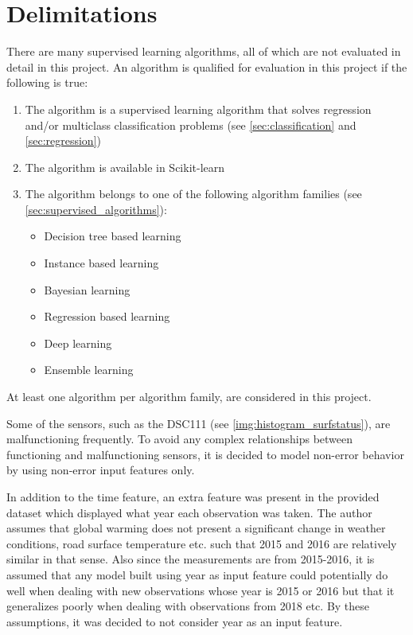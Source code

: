 \section{Delimitations} \label{sec:delimitations}
	There are many supervised learning algorithms, all of which are not evaluated in detail in this project. An algorithm is qualified for evaluation in this project if the following is true:
	\begin{enumerate}
		\item The algorithm is a supervised learning algorithm that solves regression and/or multiclass classification problems (see \ref{sec:classification} and \ref{sec:regression})
		\item The algorithm is available in Scikit-learn \cite{WEBSITE:15}
		\item The algorithm belongs to one of the following algorithm families (see \ref{sec:supervised_algorithms}):
			\begin{itemize}
				\item Decision tree based learning %
				\item Instance based learning %
				\item Bayesian learning %
				\item Regression based learning %
				\item Deep learning %
				\item Ensemble learning %
			\end{itemize}
	\end{enumerate}
	At least one algorithm per algorithm family, are considered in this project. %

	Some of the sensors, such as the DSC111 (see \ref{img:histogram_surfstatus}), are malfunctioning frequently. To avoid any complex relationships between functioning and malfunctioning sensors, it is decided to model non-error behavior by using non-error input features only. 

	In addition to the time feature, an extra feature was present in the provided dataset which displayed what year each observation was taken. The author assumes that global warming does not present a significant change in weather conditions, road surface temperature etc. such that 2015 and 2016 are relatively similar in that sense. Also since the measurements are from 2015-2016, it is assumed that any model built using year as input feature could potentially do well when dealing with new observations whose year is 2015 or 2016 but that it generalizes poorly when dealing with observations from 2018 etc. By these assumptions, it was decided to not consider year as an input feature. 

